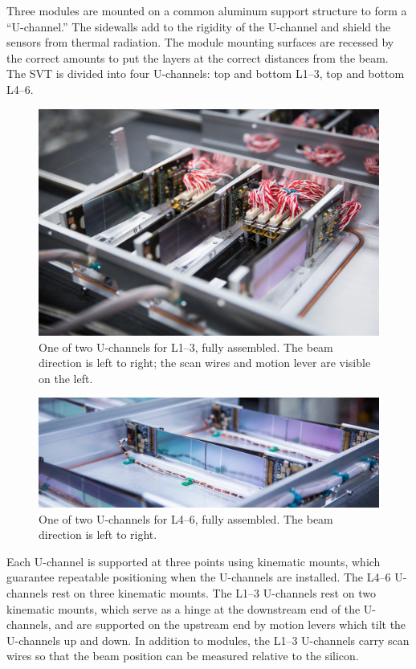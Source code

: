 Three modules are mounted on a common aluminum support structure to form a ``U-channel.''
The sidewalls add to the rigidity of the U-channel and shield the sensors from thermal radiation.
The module mounting surfaces are recessed by the correct amounts to put the layers at the correct distances from the beam.
The SVT is divided into four U-channels: top and bottom L1--3, top and bottom L4--6.

\begin{figure}[htp]
    \includegraphics[width=\textwidth]{detector/figs/l123}
    \caption{One of two U-channels for L1--3, fully assembled.
    The beam direction is left to right; the scan wires and motion lever are visible on the left.}
    \label{fig:l123}
\end{figure}

\begin{figure}[htp]
    \includegraphics[width=\textwidth]{detector/figs/l456}
    \caption{One of two U-channels for L4--6, fully assembled.
    The beam direction is left to right.}
    \label{fig:l456}
\end{figure}

Each U-channel is supported at three points using kinematic mounts, which guarantee repeatable positioning when the U-channels are installed.
The L4--6 U-channels rest on three kinematic mounts.
The L1--3 U-channels rest on two kinematic mounts, which serve as a hinge at the downstream end of the U-channels, and are supported on the upstream end by motion levers which tilt the U-channels up and down.
In addition to modules, the L1--3 U-channels carry scan wires so that the beam position can be measured relative to the silicon.

